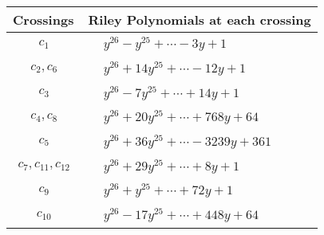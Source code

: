 \documentclass[1p]{elsarticle_modified}
\theoremstyle{definition}
\begin{document}
\begin{tabular}{m{50pt}|m{274pt}}
Crossings & \hspace{64pt}Riley Polynomials at each crossing \\
\hline $$\begin{aligned}c_{1}\end{aligned}$$&$\begin{aligned}
&y^{26}- y^{25}+\cdots-3 y+1
\end{aligned}$\\
\hline $$\begin{aligned}c_{2},c_{6}\end{aligned}$$&$\begin{aligned}
&y^{26}+14 y^{25}+\cdots-12 y+1
\end{aligned}$\\
\hline $$\begin{aligned}c_{3}\end{aligned}$$&$\begin{aligned}
&y^{26}-7 y^{25}+\cdots+14 y+1
\end{aligned}$\\
\hline $$\begin{aligned}c_{4},c_{8}\end{aligned}$$&$\begin{aligned}
&y^{26}+20 y^{25}+\cdots+768 y+64
\end{aligned}$\\
\hline $$\begin{aligned}c_{5}\end{aligned}$$&$\begin{aligned}
&y^{26}+36 y^{25}+\cdots-3239 y+361
\end{aligned}$\\
\hline $$\begin{aligned}c_{7},c_{11},c_{12}\end{aligned}$$&$\begin{aligned}
&y^{26}+29 y^{25}+\cdots+8 y+1
\end{aligned}$\\
\hline $$\begin{aligned}c_{9}\end{aligned}$$&$\begin{aligned}
&y^{26}+y^{25}+\cdots+72 y+1
\end{aligned}$\\
\hline $$\begin{aligned}c_{10}\end{aligned}$$&$\begin{aligned}
&y^{26}-17 y^{25}+\cdots+448 y+64
\end{aligned}$\\
\hline
\end{tabular}\\~\\
\end{document}
